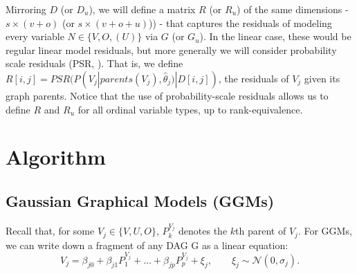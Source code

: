 \documentclass{article}
\begin{document}
Mirroring $D$ (or $D_u$), we will define a matrix $R$ (or $R_u$) of the same dimensions - $s \times (v + o)$ (or $s \times (v + o + u)$)) - that captures the residuals of modeling every variable $N \in \{V, O, (U)\}$ via $G$ (or $G_u$).  In the linear case, these would be regular linear model residuals, but more generally we will consider probability scale residuals (PSR, \cite{shepherd_probability-scale_2016}).  That is, we define $R[i, j] = PSR(P(V_j | parents(V_j), \hat{\theta}_j) | D[i, j])$, the residuals of $V_j$ given its graph parents.  Notice that the use of probability-scale residuals allows us to define $R$ and $R_u$ for all ordinal variable types, up to rank-equivalence.

\section{Algorithm}
\subsection{Gaussian Graphical Models (GGMs)}
Recall that, for some $V_j \in \{V, U, O\}$, $P^{V_j}_k$ denotes the $k$th parent of $V_j$.  For GGMs, we can write down a fragment of any DAG G as a linear equation:
\begin{equation}
V_j = \beta_{j0} + \beta_{j1} P^{V_j}_1 + \dots + \beta_{jp} P^{V_j}_p + \xi_j, \qquad \xi_j \sim \mathcal{N}(0, \sigma_j).
\end{equation}
\end{document}
